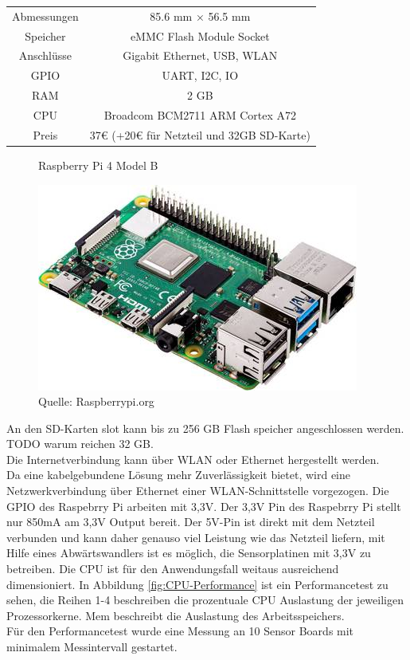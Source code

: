\begin{center}
\begin{tabular}{ c c }
 Abmessungen & 85.6 mm × 56.5 mm \\ 
 Speicher & eMMC Flash Module Socket \\  
 Anschlüsse & Gigabit Ethernet, USB, WLAN \\  
 GPIO & UART, I2C, IO \\  
 RAM & 2 GB \\  
 CPU & Broadcom BCM2711 ARM Cortex A72 \\  
 Preis & 37€ (+20€ für Netzteil und 32GB SD-Karte)  
\end{tabular}
\end{center}
\begin{figure}[H]
  \centering
    \caption{Raspberry Pi 4 Model B}
 \includegraphics[width=0.5\linewidth]{img/Raspberry-Pi-4-Model-B}
  \caption*{Quelle: Raspberrypi.org}
  \label{fig:Raspberry_Pi_4_Model_B}
\end{figure}
An den SD-Karten slot kann bis zu 256 GB Flash speicher angeschlossen werden.
TODO warum reichen 32 GB.\\
Die Internetverbindung kann über WLAN oder Ethernet hergestellt werden.\\
Da eine kabelgebundene Lösung mehr Zuverlässigkeit bietet, wird eine Netzwerkverbindung über Ethernet einer WLAN-Schnittstelle vorgezogen. 
Die GPIO des Raspebrry Pi arbeiten mit 3,3V.
Der 3,3V Pin des Raspebrry Pi stellt nur 850mA am 3,3V Output bereit.
Der 5V-Pin ist direkt mit dem Netzteil verbunden und kann daher genauso viel Leistung wie das Netzteil liefern, mit Hilfe eines Abwärtswandlers ist es möglich, die Sensorplatinen mit 3,3V zu betreiben.
Die CPU ist für den Anwendungsfall weitaus ausreichend dimensioniert.
In Abbildung \ref{fig:CPU-Performance} ist ein Performancetest zu sehen, die Reihen 1-4 beschreiben die prozentuale CPU Auslastung der jeweiligen Prozessorkerne.
Mem beschreibt die Auslastung des Arbeitsspeichers.\\
Für den Performancetest wurde eine Messung an 10 Sensor Boards mit minimalem Messintervall gestartet.
